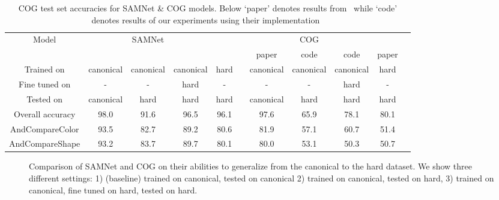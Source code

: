 \begin{table}[t]
\caption{COG test set accuracies for SAMNet \& COG models. Below `paper' denotes results from~\cite{yang2018dataset} 
	while `code' denotes results of our experiments using their implementation~\cite{yang2018implement}}
\centering
\begin{adjustbox}{width=\textwidth}
\begin{tabular}{ccccccccccc}
	\toprule
	Model & & SAMNet & && && COG&& \\
	\cmidrule{2-5} \cmidrule{7-11} 
	&&&&& & paper & code & code & paper&\\
	\cmidrule{7-9} \cmidrule{10-11}
	Trained on       & canonical & canonical & canonical & hard &           &  canonical  & canonical  & canonical & hard \\ 
	Fine tuned on  & - & - & hard  & - &           & -   & - & hard & - \\ 
	Tested on        & canonical & hard & hard & hard &            &canonical  & hard & hard & hard  \\ 
	\midrule	
	Overall accuracy & 98.0 & 91.6 & 96.5  & 96.1 &         & 97.6  & 65.9 & 78.1& 80.1 \\ 	
	\midrule 	
	AndCompareColor	&	93.5		&	82.7	&	89.2	&  80.6 &		&81.9	&57.1&60.7  &	51.4 \\ 
	AndCompareShape	&	93.2 		&	83.7	&	89.7	& 80.1 &	&	80.0	&53.1	&50.3 &50.7 \\ 
	\bottomrule
\end{tabular}
\end{adjustbox}
\label{tab:results}
\end{table}


\begin{figure}
	\centering
	\caption{Comparison of SAMNet and COG on their abilities to generalize from the canonical to the hard dataset. We show three different settings: 1) (baseline) trained on canonical, tested on canonical 2) trained on canonical, tested on hard, 3) trained on canonical, fine tuned on hard, tested on hard. }
\end{figure}



